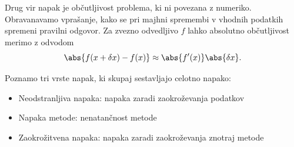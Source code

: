 Drug vir napak je občutljivost problema, ki ni povezana z numeriko.
Obravanavamo vprašanje, kako se pri majhni spremembi v vhodnih podatkih spremeni
pravilni odgovor.
Za zvezno odvedljivo $f$ lahko absolutno občutljivost merimo z odvodom
\[
  \abs{f(x+\delta x) - f(x)} \approx \abs{f'(x)} \abs{\delta x}.
\]

Poznamo tri vrste napak, ki skupaj sestavljajo celotno napako:
\begin{itemize}
\item Neodstranljiva napaka: napaka zaradi zaokroževanja podatkov
\item Napaka metode: nenatančnost metode
\item Zaokrožitvena napaka: napaka zaradi zaokroževanja znotraj metode
\end{itemize}

